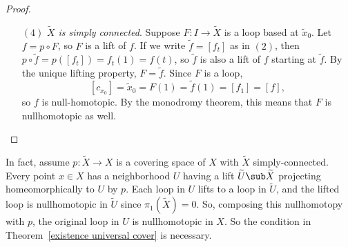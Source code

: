 \begin{proof}
\begin{itemize}
\item[$(4)$] \textit{$\widetilde{X}$ is simply connected}. Suppose $F:I\to\widetilde{X}$ is a loop based at $\widetilde{x}_0$. Let $f=p\circ F$, so $F$ is a lift of $f$. If we write $\widetilde{f}=[f_t]$ as in $(2)$, then $p\circ\widetilde{f}=p([f_t])=f_t(1)=f(t)$, so $\widetilde{f}$ is also a lift of $f$ starting at $\widetilde{f}$. By the unique lifting property, $F=\widetilde{f}$. Since $F$ is a loop, 
\[[c_{x_0}]=\widetilde{x}_0=F(1)=\widetilde{f}(1)=[f_1]=[f],\]
so $f$ is null-homotopic. By the monodromy theorem, this means that $F$ is nullhomotopic as well.
\end{itemize}
\end{proof}
\begin{remark}
In fact, assume $p:\widetilde{X}\to X$ is a covering space of $X$ with $\widetilde{X}$ simply-connected. Every point $x\in X$ has a neighborhood $U$ having a lift $\widetilde{U}\sub\widetilde{X}$ projecting homeomorphically to $U$ by $p$. Each loop in $U$ lifts to a loop in $\widetilde{U}$, and the lifted loop is nullhomotopic in $\widetilde{U}$ since $\pi_1(\widetilde{X})=0$. So, composing this
nullhomotopy with $p$, the original loop in $U$ is nullhomotopic in $X$. So the condition in Theorem~\ref{existence universal cover} is necessary.
\end{remark}
